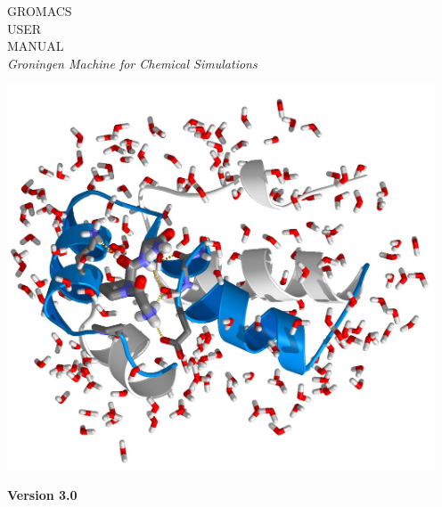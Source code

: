 \documentclass[11pt,a4paper,twoside]{gmxmanual}
\newcommand{\gmxver}{3.0}
\begin{document}
\addtolength{\oddsidemargin}{-5mm}
%
%
\pagestyle{empty}
\begin{center}

{
\fontsize{64}{70} \selectfont 
GROMACS\\
USER \\
MANUAL\\
}
\vspace{1cm}
{\Large \em Groningen Machine for Chemical Simulations}

\vspace{0.75cm}
\includegraphics[width=5in]{plots/fp-highres}

\vspace{0.25cm}
{\fontsize{30}{36} \selectfont \bf Version \gmxver}

\end{center}
\vfill

\cleardoublepage
\addtolength{\oddsidemargin}{5mm}

%
%
\renewcommand{\chaptermark}[1]{\markboth{#1}{#1}} %
\renewcommand{\sectionmark}[1]{\markright{\thesection\ #1}}
\lhead[\fancyplain{}{\em\thepage}]{\fancyplain{}{\em\rightmark}}
\rhead[\fancyplain{}{\em\leftmark}]{\fancyplain{}{\em\thepage}}
\cfoot{}
\end{document}
